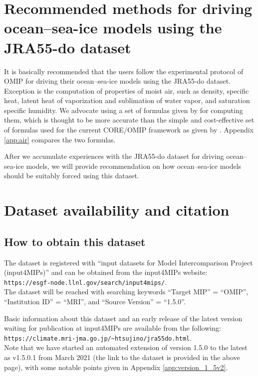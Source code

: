 \documentclass[dvipdfmx]{elsarticle_mod}
\begin{document}
\section{Recommended methods for driving ocean--sea-ice models using the JRA55-do dataset}
\label{sec:protocols}


It is basically recommended that the users follow the experimental protocol of OMIP \citep{Griffies_et_al_2016} for driving their ocean--sea-ice models using the JRA55-do dataset. Exception is the computation of properties of moist air, such as density, specific heat, latent heat of vaporization and sublimation of water vapor, and saturation specific humidity. We advocate using a set of formulas given by \citet{Gill_1982} for computing them, which is thought to be more accurate than the simple and cost-effective set of formulas used for the current CORE/OMIP framework as given by \citet{Large_and_Yeager_2004}. Appendix \ref{app:air} compares the two formulas.

After we accumulate experiences with the JRA55-do dataset for driving ocean--sea-ice models, we will provide recommendation on how ocean--sea-ice models should be suitably forced using this dataset.


\section{Dataset availability and citation}
\label{sec:availability-citation}

\subsection{How to obtain this dataset}

The dataset is registered with ``input datasets for Model Intercomparison Project (input4MIPs)'' and can be obtained from the input4MIPs website:\\
\hspace*{3zw}\texttt{https://esgf-node.llnl.gov/search/input4mips/}.\\
The dataset will be reached with searching keywords ``Target MIP'' = ``OMIP'', ``Institution ID'' = ``MRI'', and ``Source Version'' = ``1.5.0''.

Basic information about this dataset and an early release of the latest version waiting for publication at input4MIPs are available from the following:\\
\hspace*{3zw}\texttt{https://climate.mri-jma.go.jp/\~{}htsujino/jra55do.html}.\\
Note that we have started an automated extension of version 1.5.0 to the latest as v1.5.0.1 from March 2021 (the link to the dataset is provided in the above page), with some notable points given in Appendix \ref{app:version_1_5v2}.
\end{document}
